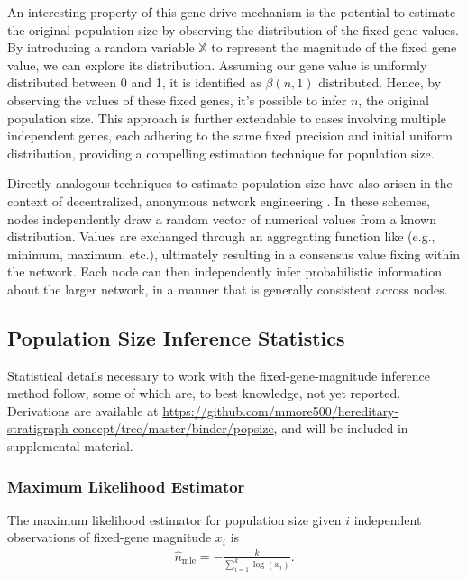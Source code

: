 

An interesting property of this gene drive mechanism is the potential to estimate the original population size by observing the distribution of the fixed gene values.
By introducing a random variable $\mathbb{X}$ to represent the magnitude of the fixed gene value, we can explore its distribution. Assuming our gene value is uniformly distributed between 0 and 1, it is identified as $\beta(n, 1)$ \citep{gentle2009computational} distributed.
Hence, by observing the values of these fixed genes, it's possible to infer $n$, the original population size.
This approach is further extendable to cases involving multiple independent genes, each adhering to the same fixed precision and initial uniform distribution, providing a compelling estimation technique for population size.

Directly analogous techniques to estimate population size have also arisen in the context of decentralized, anonymous network engineering \citep{varagnolo2010distributed,hakan2012distributed}.
In these schemes, nodes independently draw a random vector of numerical values from a known distribution.
Values are exchanged through an aggregating function like (e.g., minimum, maximum, etc.), ultimately resulting in a consensus value fixing within the network.
Each node can then independently infer probabilistic information about the larger network, in a manner that is generally consistent across nodes.

\subsection{Population Size Inference Statistics}
\label{sec:population-size-inference-stats}

Statistical details necessary to work with the fixed-gene-magnitude inference method follow, some of which are, to best knowledge, not yet reported.
Derivations are available at \url{https://github.com/mmore500/hereditary-stratigraph-concept/tree/master/binder/popsize}, and will be included in supplemental material.

\subsubsection{Maximum Likelihood Estimator}

The maximum likelihood estimator for population size given $i$ independent observations of fixed-gene magnitude $x_i$ is
\begin{align} \label{eqn:popsize_mle}
\hat{n}_\mathrm{mle} = -\frac{k}{\sum_{i=1}^k \log( x_i )}.
\end{align}

